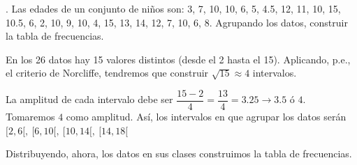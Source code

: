 \begin{example}. \label{ejparamedia}
	Las edades de un conjunto de niños son: 3, 7, 10, 10, 6, 5, 4.5, 12, 11, 10, 15, 10.5, 6, 2, 10, 9, 10, 4, 15, 13, 14, 12, 7, 10, 6, 8. Agrupando los datos, construir la tabla de frecuencias.
	
	\vspace{6mm} En los 26 datos hay 15 valores distintos (desde el 2 hasta el 15). Aplicando, p.e., el criterio de Norcliffe, tendremos que construir $\sqrt{15}\approx 4$ intervalos.
	
	\vspace{2mm}La amplitud de cada intervalo debe ser $\dfrac{15-2}{4}=\dfrac{13}{4}=3.25 \to 3.5 \text{ ó } 4$. Tomaremos $4$ como amplitud. Así, los intervalos en que agrupar los datos serán $[2,6[,\ [6,10[,\ [10,14[, \ [14,18[$
	
	\vspace{2mm}Distribuyendo, ahora, los datos en sus clases construimos la tabla de frecuencias.
	

\end{example}
